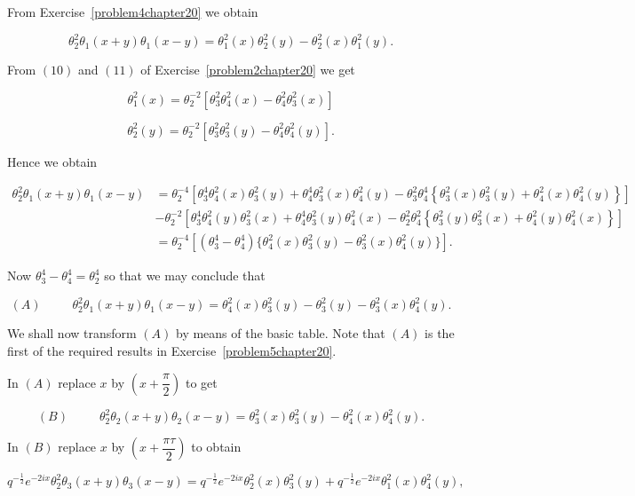 \begin{solution}
From Exercise~\ref{problem4chapter20} we obtain

$$\theta_2^2 \theta_1(x+y) \theta_1(x-y) = \theta_1^2(x) \theta_2^2(y) - \theta_2^2(x) \theta_1^2(y).$$

From $(10)$ and $(11)$ of Exercise~\ref{problem2chapter20} we  get

$$\theta_1^2(x) = \theta_2^{-2} \left[ \theta_3^2 \theta_4^2(x) - \theta_4^2 \theta_3^2(x) \right]$$

$$\theta_2^2(y) = \theta_2^{-2} \left[ \theta_3^2 \theta_3^2(y) - \theta_4^2 \theta_4^2(y) \right].$$

Hence we obtain

$$\begin{array}{ll}
\theta_2^2 \theta_1(x+y) \theta_1(x-y) &= \theta_2^{-4} \left[ \theta_3^4 \theta_4^2(x) \theta_3^2(y) + \theta_4^4 \theta_3^2 (x) \theta_4^2(y) - \theta_3^2 \theta_4^4 \left\{ \theta_3^2(x) \theta_3^2(y) + \theta_4^2(x) \theta_4^2(y) \right\} \right] \\
&- \theta_2^{-2} \left[ \theta_3^4 \theta_4^2(y) \theta_3^2(x) + \theta_4^4 \theta_3^2(y) \theta_4^2(x) - \theta_2^2 \theta_4^2 \left\{ \theta_3^2(y) \theta_3^2(x) + \theta_4^2(y) \theta_4^2(x) \right\} \right] \\
&= \theta_2^{-4} \left[ (\theta_3^4 - \theta_4^4) \{ \theta_4^2(x) \theta_3^2(y) - \theta_3^2(x) \theta_4^2(y) \} \right].
\end{array}$$

Now $\theta_3^4 - \theta_4^4 = \theta_2^4$ so that we may conclude that

$$(A) \hspace{30pt} \theta_2^2 \theta_1(x+y) \theta_1(x-y) = \theta_4^2(x) \theta_3^2(y) - \theta_3^2(y) - \theta_3^2(x) \theta_4^2(y).$$

We shall now transform $(A)$ by means of the basic table. Note that $(A)$ is the first of the required results in Exercise~\ref{problem5chapter20}.

In $(A)$ replace $x$ by $\left( x + \dfrac{\pi}{2} \right)$ to get

$$(B) \hspace{30pt} \theta_2^2 \theta_2(x+y) \theta_2(x-y) = \theta_3^2(x) \theta_3^2(y) - \theta_4^2(x) \theta_4^2(y).$$

In $(B)$ replace $x$ by $\left( x + \dfrac{\pi \tau}{2} \right)$ to obtain

$$q^{-\frac{1}{2}} e^{-2ix} \theta_2^2 \theta_3(x+y) \theta_3(x-y) = q^{-\frac{1}{2}} e^{-2ix} \theta_2^2(x) \theta_3^2(y) + q^{-\frac{1}{2}} e^{-2ix} \theta_1^2(x) \theta_4^2(y),$$


\end{solution}
